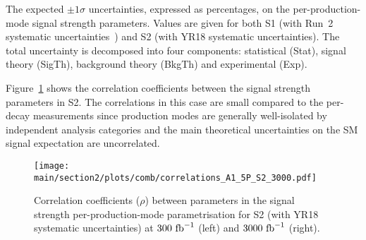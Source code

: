 \begin{table}[hbtp]
\centering
\caption{The expected $\pm 1\sigma$ uncertainties, expressed as percentages, on the per-production-mode signal strength parameters. Values are given for both S1 (with Run~2 systematic uncertainties~\cite{Sirunyan:2018koj}) and S2 (with YR18 systematic uncertainties). The total uncertainty is decomposed into four components: statistical (Stat), signal theory (SigTh), background theory (BkgTh) and experimental (Exp).}

\label{tab:summary_A1_5P}
\vspace{0.5cm}
\end{table}

Figure~\ref{fig:corr_A1_5P} shows the correlation coefficients between the signal strength parameters in S2. The correlations in this case are small compared to the per-decay measurements since production modes are generally well-isolated by independent analysis categories and the main theoretical uncertainties on the SM signal expectation are uncorrelated.

\begin{figure}[hbtp]
\centering
\texttt{[image: \\main/section2/plots/comb/correlations\_A1\_5P\_S2\_3000.pdf]}%
\caption{Correlation coefficients ($\rho$) between parameters in the signal strength per-production-mode parametrisation for S2 (with YR18 systematic uncertainties) at $300~\text{fb}^{-1}$ (left) and $3000~\text{fb}^{-1}$ (right).}
\label{fig:corr_A1_5P}
\end{figure}
